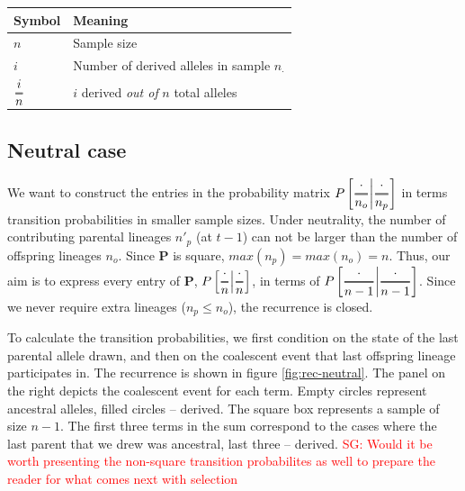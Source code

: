 \documentclass[review]{elsarticle}
\newcommand{\Dfrac}[2]{%
  \ooalign{%
    $\genfrac{}{}{1.2pt}0{#1}{#2}$\cr%
    $\color{white}\genfrac{}{}{.4pt}0{\phantom{#1}}{\phantom{#2}}$}%
}
\newcommand{\cond}{\middle\vert}
\newcommand{\sgcomment}[1]{\textcolor{red}{SG: #1}}
\begin{document}
\begin{center}
\begin{tabular}{ll}
Symbol & Meaning\\
\hline
$n$ & Sample size\\
$i$ & Number of derived alleles in sample $n_{\cdot}$\\
$\Dfrac{i}{n}$ & $i$ derived \emph{out of} $n$ total alleles\\
\end{tabular}
\end{center}

\subsection{Neutral case}

We want to construct the entries in the probability matrix
$P\left[ \Dfrac{\cdot}{n_o} \cond \Dfrac{\cdot}{n_p} \right]$ in terms transition probabilities in
smaller sample sizes. Under neutrality, the number of contributing parental lineages $n'_p$ (at
$t-1$) can not be larger than the number of offspring lineages $n_o$. Since $\mathbf{P}$ is square,
$max(n_p)=max(n_o)=n$. Thus, our aim is to express every entry of $\mathbf{P}$,
$P\left[ \Dfrac{\cdot}{n} \cond\Dfrac{\cdot}{n} \right]$, in terms of
$P\left[ \Dfrac{\cdot}{n-1} \cond \Dfrac{\cdot}{n-1} \right]$. Since we never require extra lineages
($n_p\le n_o$), the recurrence is closed.

To calculate the transition probabilities, we first condition on the state of the last parental
allele drawn, and then on the coalescent event that last offspring lineage participates in. The
recurrence is shown in figure \ref{fig:rec-neutral}. The panel on the right depicts the coalescent
event for each term. Empty circles represent ancestral alleles, filled circles -- derived. The
square box represents a sample of size $n-1$. The first three terms in the sum correspond to the
cases where the last parent that we drew was ancestral, last three -- derived.
\sgcomment{Would it be worth presenting the non-square transition probabilites as well to prepare the reader for what comes next with selection}
\end{document}
